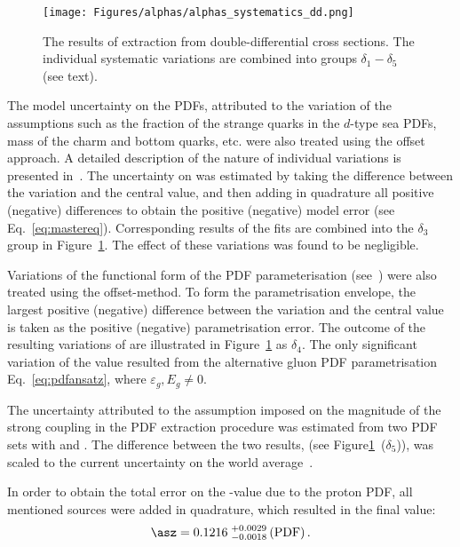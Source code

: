 \begin{landscape}
\begin{figure}[p]
 \centering
 \caption{The results of \asz extraction from double-differential cross sections. The individual systematic variations are combined into groups $\delta_1-\delta_5$ (see text).}
 \label{fig:asthunc_dd}
 \texttt{[image: Figures/alphas/alphas\_systematics\_dd.png]}
\end{figure}
\end{landscape}

The model uncertainty on the PDFs, attributed to the variation of the assumptions such as the fraction of the strange quarks in the $d$-type sea PDFs, mass of the charm and bottom quarks, etc. were also treated using the offset approach. A detailed description of the nature of individual variations is presented in~\cite{upub:herapdf1.5}. The uncertainty on \asz was estimated  by taking the difference between the variation and the central value, and then adding in quadrature all positive (negative) differences to obtain the positive (negative) model error (see Eq.~\eqref{eq:mastereq}). Corresponding results of the \as fits are combined into the $\delta_3$ group in Figure~\ref{fig:asthunc_dd}. The effect of these variations was found to be negligible.

Variations of the functional form of the PDF parameterisation (see~\cite{upub:herapdf1.5}) were also treated using the offset-method. To form the parametrisation envelope, the largest positive (negative) difference between the variation and the central value is taken as the positive (negative) parametrisation error. The outcome of the resulting variations of \asz are illustrated in Figure~\ref{fig:asthunc_dd} as $\delta_4$. The only significant variation of the \asz value resulted from the alternative gluon PDF parametrisation Eq.~\eqref{eq:pdfansatz}, where $\varepsilon_g, E_g \neq 0$.

The uncertainty attributed to the assumption imposed on the magnitude of the strong coupling in the PDF extraction procedure was estimated from two PDF sets with  and . The difference between the two results, (see Figure\ref{fig:asthunc_dd}~($\delta_5$)), was scaled to the current uncertainty on the world average~\cite{Bethke:2012jm}.

In order to obtain the total error on the \asz-value due to the proton PDF, all mentioned sources were added in quadrature, which resulted in the final value:
\begin{equation}
 \asz = 0.1216\;^{+0.0029}_{-0.0018}\left(\text{PDF}\right).
\end{equation}

